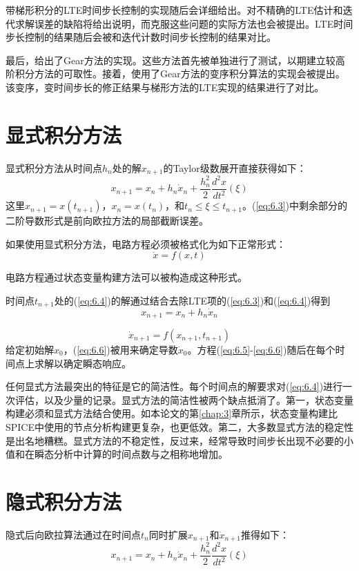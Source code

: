 带梯形积分的LTE时间步长控制的实现随后会详细给出。对不精确的LTE估计和迭代求解误差的缺陷将给出说明，而克服这些问题的实际方法也会被提出。LTE时间步长控制的结果随后会被和迭代计数时间步长控制的结果对比。

最后，给出了Gear方法\cite{ref-66,ref-67}的实现。这些方法首先被单独进行了测试，以期建立较高阶积分方法的可取性。接着，使用了Gear方法的变序积分算法的实现会被提出。该变序，变时间步长的修正结果与梯形方法的LTE实现的结果进行了对比。

\section{显式积分方法}
显式积分方法从时间点$h_n$处的解$x_{n+1}$的Taylor级数展开直接获得如下：
\begin{equation}
    x_{n+1} = x_n + h_n \dot{x}_n + \frac{h^2_n}{2}\frac{d^2x}{dt^2}(\xi)
    \label{eq:6.3}
\end{equation}
这里$x_{n+1} = x(t_{n+1})$，$x_n = x(t_n)$，和$t_n \leq \xi \leq t_{n+1}$。(\ref{eq:6.3})中剩余部分的二阶导数形式是前向欧拉方法的局部截断误差。

如果使用显式积分方法，电路方程必须被格式化为如下正常形式：
\begin{equation}
    \dot{x} = f(x,t)
    \label{eq:6.4}
\end{equation}

电路方程通过状态变量构建方法可以被构造成这种形式\cite{ref-7}。

时间点$t_{n+1}$处的(\ref{eq:6.4})的解通过结合去除LTE项的(\ref{eq:6.3})和(\ref{eq:6.4})得到
\begin{equation}
    x_{n+1} = x_n + h_n \dot{x}_n
    \label{eq:6.5}
\end{equation}

\begin{equation}
    \dot{x}_{n+1} = f(x_{n+1},t_{n+1})
    \label{eq:6.6}
\end{equation}
给定初始解$x_0$，(\ref{eq:6.6})被用来确定导数$\dot{x}_0$。方程(\ref{eq:6.5}-\ref{eq:6.6})随后在每个时间点上求解以确定瞬态响应。

任何显式方法最突出的特征是它的简洁性。每个时间点的解要求对(\ref{eq:6.4})进行一次评估，以及少量的记录。显式方法的简洁性被两个缺点抵消了。第一，状态变量构建必须和显式方法结合使用。如本论文的第\ref{chap:3}章所示，状态变量构建比SPICE中使用的节点分析构建更复杂，也更低效。第二，大多数显式方法的稳定性是出名地糟糕。显式方法的不稳定性，反过来，经常导致时间步长出现不必要的小值和在瞬态分析中计算的时间点数与之相称地增加。

\section{隐式积分方法}
隐式后向欧拉算法通过在时间点$t_n$同时扩展$x_{n+1}$和$\dot{x}_{n+1}$推得如下：
\begin{equation}
    x_{n+1} = x_n + h_n \dot{x}_n + \frac{h^2_n}{2}\frac{d^2x}{dt^2}(\xi)
    \label{eq:6.7}
\end{equation}

